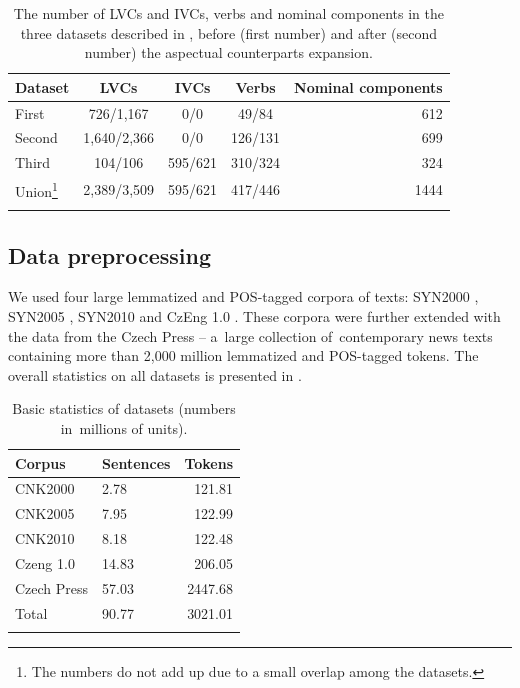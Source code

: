 \documentclass[output=paper,modfonts,nonflat]{langsci/langscibook}
\begin{document}
\begin{table}
	
	\begin{tabularx}{\textwidth}{XCCCr}
	 \lsptoprule
     Dataset  & LVCs        & IVCs    & Verbs   & Nominal components \\ 
     \midrule
     First    & 726/1,167   & 0/0     & 49/84   & 612   \\ %
     Second   & 1,640/2,366 & 0/0     & 126/131 & 699   \\ %
     Third    & 104/106     & 595/621 & 310/324 & 324   \\ %
     Union\footnote{The numbers do not add up due to a small 
	overlap among the datasets.}    & 2,389/3,509 & 595/621 & 417/446 & 1444  \\ 
	\lspbottomrule  
	\end{tabularx} 
	\caption{The number of LVCs and IVCs, verbs and nominal components in the 
	three datasets described in , before (first number) and after (second number) the aspectual counterparts expansion.}%
	\label{statistics}
\end{table}

 
	
\subsection{Data preprocessing} 
\label{sec:preprocess}
We used four large lemmatized and POS-tagged corpora of  texts: 
SYN2000 \citep{SYN2000}, SYN2005 \citep{SYN2005}, SYN2010 \citep{SYN2010} and 
CzEng 1.0 \citep{czeng10}. These corpora were further extended with the 
data from the Czech Press -- a~large collection of~contemporary news texts 
containing more than 2,000 million lemmatized and POS-tagged tokens. The 
overall statistics on all datasets is presented in .

\begin{table} 
\begin{tabularx}{.8\textwidth}{XYr}
\lsptoprule
Corpus & Sentences & Tokens \\ 
\midrule
CNK2000 & 2.78 & 121.81 \\
CNK2005 & 7.95 & 122.99 \\
CNK2010 & 8.18 & 122.48 \\
Czeng 1.0 & 14.83 & 206.05 \\
Czech Press & 57.03 & 2447.68 \\ \midrule
Total & 90.77 & 3021.01 \\
\lspbottomrule
\end{tabularx}
\caption{Basic statistics of datasets (numbers in~millions of units).}
\label{data}
\end{table}
\end{document}
